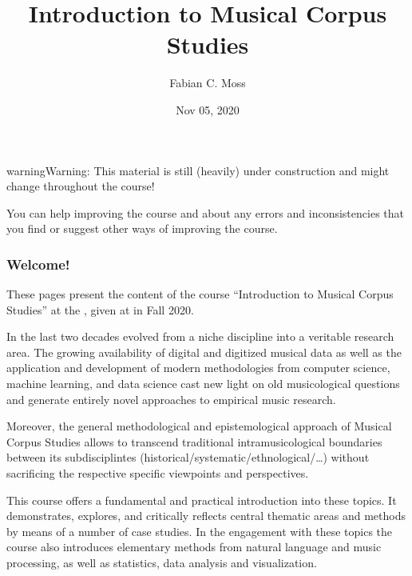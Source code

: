 \documentclass[letterpaper,10pt,english]{sphinxmanual}
\title{Introduction to Musical Corpus Studies}
\date{Nov 05, 2020}
\author{Fabian C.\@{} Moss}
\begin{document}
\pagestyle{empty}
\sphinxmaketitle
\pagestyle{plain}
\sphinxtableofcontents
\pagestyle{normal}
\label{\detokenize{index::doc}}



\begin{sphinxadmonition}{warning}{Warning:}
This material is still (heavily) under construction and might change throughout the course!

You can help improving the course and  about any errors and inconsistencies that you find
or suggest other ways of improving the course.
\end{sphinxadmonition}
\subsubsection*{Welcome!}

These pages present the content of the course “Introduction to Musical Corpus Studies” at the ,
given at  in Fall 2020.

In the last two decades  evolved from a niche discipline into a veritable research area.
The growing availability of digital and digitized musical data as well as the application and development of modern
methodologies from computer science, machine learning, and data science cast new light on old musicological questions
and generate entirely novel approaches to empirical music research.

Moreover, the general methodological and epistemological approach of Musical Corpus Studies allows to transcend traditional
intra\sphinxhyphen{}musicological boundaries between its sub\sphinxhyphen{}disciplintes (historical/systematic/ethnological/…) without sacrificing the
respective specific viewpoints and perspectives.

This course offers a fundamental and practical introduction into these topics.
It demonstrates, explores, and critically reflects central thematic areas and methods by means of a number of case studies.
In the engagement with these topics the course also introduces elementary methods from natural language and music processing,
as well as statistics, data analysis and visualization.
\end{document}

